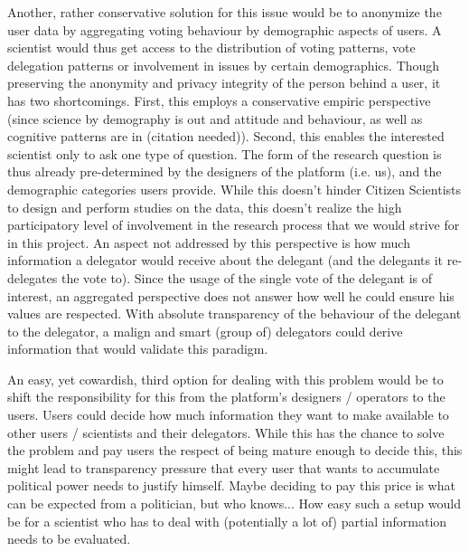 Another, rather conservative solution for this issue would be to anonymize the user data by aggregating voting behaviour by demographic aspects of users. A scientist would thus get access to the distribution of voting patterns, vote delegation patterns or involvement in issues by certain demographics. Though preserving the anonymity and privacy integrity of the person behind a user, it has two shortcomings. First, this employs a conservative empiric perspective (since science by demography is out and attitude and behaviour, as well as cognitive patterns are in (citation needed)). Second, this enables the interested scientist only to ask one type of question. The form of the research question is thus already pre-determined by the designers of the platform (i.e. us), and the demographic categories users provide. While this doesn't hinder Citizen Scientists to design and perform studies on the data, this doesn't realize the high participatory level of involvement in the research process that we would strive for in this project.
An aspect not addressed by this perspective is how much information a delegator would receive about the delegant (and the delegants it re-delegates the vote to). Since the usage of the single vote of the delegant is of interest, an aggregated perspective does not answer how well he could ensure his values are respected. With absolute transparency of the behaviour of the delegant to the delegator, a malign and smart (group of) delegators could derive information that would validate this paradigm.

An easy, yet cowardish, third option for dealing with this problem would be to shift the responsibility for this from the platform's designers / operators to the users. Users could decide how much information they want to make available to other users / scientists and their delegators. While this has the chance to solve the problem and pay users the respect of being mature enough to decide this, this might lead to transparency pressure that every user that wants to accumulate political power needs to justify himself. Maybe deciding to pay this price is what can be expected from a politician, but who knows... How easy such a setup would be for a scientist who has to deal with (potentially a lot of) partial information needs to be evaluated.

